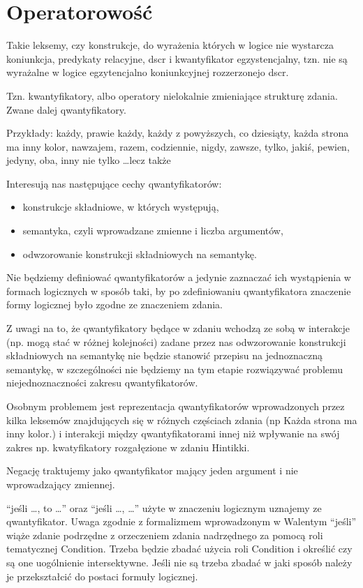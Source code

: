\documentclass[a4paper, 12pt]{article}
\theoremstyle{remark}
\begin{document}
\section{Operatorowość}
Takie leksemy, czy konstrukcje, do wyrażenia których w logice nie wystarcza koniunkcja, predykaty relacyjne, dscr i kwantyfikator egzystencjalny,
tzn. nie są wyrażalne w logice egzytencjalno koniunkcyjnej rozzerzonejo dscr.

Tzn. kwantyfikatory, albo operatory nielokalnie zmieniające strukturę zdania.
Zwane dalej qwantyfikatory.

Przykłady: każdy, prawie każdy, każdy z powyższych, co dziesiąty, 
każda strona ma inny kolor, nawzajem, razem,
codziennie, nigdy, zawsze, tylko, jakiś, pewien, jedyny, oba, inny
nie tylko \dots lecz także

Interesują nas następujące cechy qwantyfikatorów:
\begin{itemize}
\item konstrukcje składniowe, w których występują,
\item semantyka, czyli wprowadzane zmienne i liczba argumentów, 
\item odwzorowanie konstrukcji składniowych na semantykę.
\end{itemize}
Nie będziemy definiować qwantyfikatorów a jedynie zaznaczać ich wystąpienia w formach logicznych
w sposób taki, by po zdefiniowaniu qwantyfikatora znaczenie formy logicznej było zgodne ze znaczeniem zdania.

Z uwagi na to, że qwantyfikatory będące w zdaniu wchodzą ze sobą w interakcje (np. mogą stać w różnej kolejności)
zadane przez nas odwzorowanie konstrukcji składniowych na semantykę nie będzie stanowić przepisu na jednoznaczną semantykę,
w szczególności nie będziemy na tym etapie rozwiązywać problemu niejednoznaczności zakresu qwantyfikatorów.

Osobnym problemem jest reprezentacja qwantyfikatorów wprowadzonych przez kilka leksemów znajdujących się w różnych częściach
zdania (np Każda strona ma inny kolor.) i interakcji między qwantyfikatorami innej niż wpływanie na swój zakres
np. kwatyfikatory rozgałęzione w zdaniu Hintikki.

Negację traktujemy jako qwantyfikator mający jeden argument i nie wprowadzający zmiennej.

``jeśli \dots, to \dots'' oraz ``jeśli \dots, \dots'' użyte w znaczeniu logicznym uznajemy ze qwantyfikator.
Uwaga zgodnie z formalizmem wprowadzonym w Walentym ``jeśli'' wiąże zdanie podrzędne z orzeczeniem zdania nadrzędnego za pomocą
roli tematycznej Condition. Trzeba będzie zbadać użycia roli Condition i określić czy są one uogólnienie intersektywne.
Jeśli nie są trzeba zbadać w jaki sposób należy je przekształcić do postaci formuły logicznej.
\end{document}
